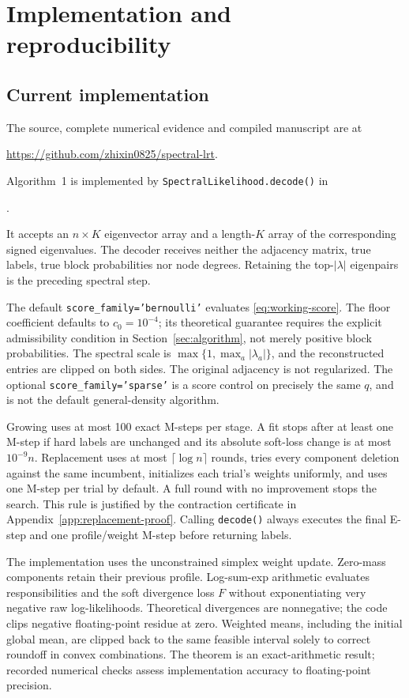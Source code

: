 \section{Implementation and reproducibility}
\label{app:implementation}

\subsection{Current implementation}
The source, complete numerical evidence and compiled manuscript are at
\begin{center}
\url{https://github.com/zhixin0825/spectral-lrt}.
\end{center}
Algorithm~1 is implemented by \texttt{SpectralLikelihood.decode()} in
\begin{center}
\small{}.
\end{center}
It accepts an $n\times K$ eigenvector array and a length-$K$ array of the corresponding signed eigenvalues. The decoder receives neither the adjacency matrix, true labels, true block probabilities nor node degrees. Retaining the top-$|\lambda|$ eigenpairs is the preceding spectral step.

The default \texttt{score\_family='bernoulli'} evaluates \eqref{eq:working-score}. The floor coefficient defaults to $c_0=10^{-4}$; its theoretical guarantee requires the explicit admissibility condition in Section~\ref{sec:algorithm}, not merely positive block probabilities. The spectral scale is $\max\{1,\max_a|\lambda_a|\}$, and the reconstructed entries are clipped on both sides. The original adjacency is not regularized. The optional \texttt{score\_family='sparse'} is a score control on precisely the same $q$, and is not the default general-density algorithm.

Growing uses at most 100 exact M-steps per stage. A fit stops after at least one M-step if hard labels are unchanged and its absolute soft-loss change is at most $10^{-9}n$. Replacement uses at most $\lceil\log n\rceil$ rounds, tries every component deletion against the same incumbent, initializes each trial's weights uniformly, and uses one M-step per trial by default. A full round with no improvement stops the search. This rule is justified by the contraction certificate in Appendix~\ref{app:replacement-proof}. Calling \texttt{decode()} always executes the final E-step and one profile/weight M-step before returning labels.

The implementation uses the unconstrained simplex weight update. Zero-mass components retain their previous profile. Log-sum-exp arithmetic evaluates responsibilities and the soft divergence loss $F$ without exponentiating very negative raw log-likelihoods. Theoretical divergences are nonnegative; the code clips negative floating-point residue at zero. Weighted means, including the initial global mean, are clipped back to the same feasible interval solely to correct roundoff in convex combinations. The theorem is an exact-arithmetic result; recorded numerical checks assess implementation accuracy to floating-point precision.

